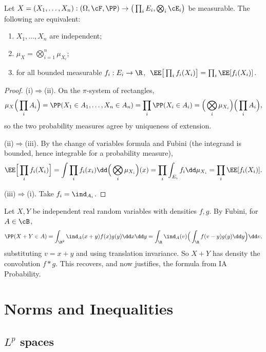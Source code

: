 \begin{proposition}\label{prop:indep-product}
	Let $X = (X_1,\dots,X_n) : (\Omega,\cF,\PP)\to \big(\prod_i E_i, \bigotimes_i \cE_i\big)$ be measurable. The following are equivalent:
	\begin{enumerate}[label=(\roman*)]
		\item $X_1,\dots,X_n$ are independent;
		\item $\mu_X = \bigotimes_{i=1}^n \mu_{X_i}$;
		\item for all bounded measurable $f_i : E_i \to \R$, $\;\EE\big[\prod_i f_i(X_i)\big] = \prod_i \EE[f_i(X_i)]$.
	\end{enumerate}
\end{proposition}
\begin{proof}
	(i)$\Rightarrow$(ii). On the $\pi$-system of rectangles,
	$$
	\mu_X\Big(\prod_i A_i\Big) = \PP(X_1\in A_1,\dots,X_n\in A_n)=\prod_i \PP(X_i\in A_i) = \Big(\bigotimes_i\mu_{X_i}\Big)\Big(\prod_i A_i\Big),
	$$
	so the two probability measures agree by uniqueness of extension.

	(ii)$\Rightarrow$(iii). By the change of variables formula and Fubini (the integrand is bounded, hence integrable for a probability measure),
	$$
	\EE\Big[\prod_i f_i(X_i)\Big] = \int \prod_i f_i(x_i)\dd\Big(\bigotimes_i\mu_{X_i}\Big)(x) = \prod_i \int_{E_i} f_i\dd\mu_{X_i} = \prod_i \EE[f_i(X_i)].
	$$

	(iii)$\Rightarrow$(i). Take $f_i = \ind_{A_i}$.
\end{proof}

\begin{example}
	Let $X,Y$ be independent real random variables with densities $f,g$. By Fubini, for $A \in \cB$,
	$$
	\PP(X+Y\in A) = \int_{\R^2}\ind_A(x+y)f(x)g(y)\dd x\dd y = \int_\R \ind_A(v)\Big(\int_\R f(v-y)g(y)\dd y\Big)\dd v,
	$$
	substituting $v = x+y$ and using translation invariance. So $X+Y$ has density the convolution $f * g$. This recovers, and now justifies, the formula from IA Probability.
\end{example}
\section{Norms and Inequalities}

\subsection{\texorpdfstring{$L^p$}{Lp} spaces}

